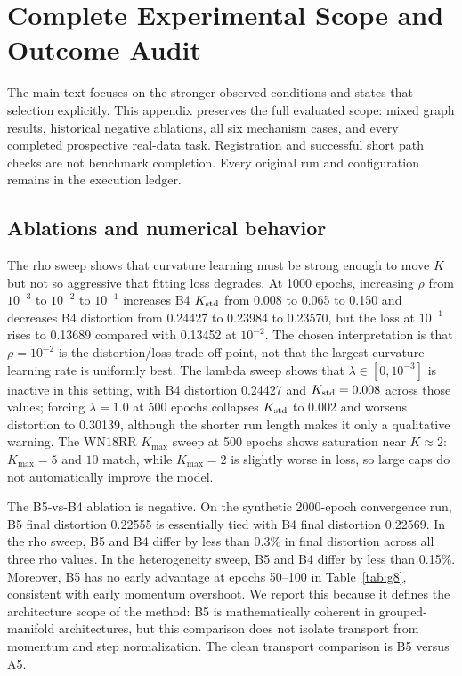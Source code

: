 \section{Complete Experimental Scope and Outcome Audit}
\label{app:extended-audit}
The main text focuses on the stronger observed conditions and states that selection explicitly. This appendix preserves the full evaluated scope: mixed graph results, historical negative ablations, all six mechanism cases, and every completed prospective real-data task. Registration and successful short path checks are not benchmark completion. Every original run and configuration remains in the execution ledger.

\subsection{Ablations and numerical behavior}

The rho sweep shows that curvature learning must be strong enough to move $K$ but not so aggressive that fitting loss degrades. At 1000 epochs, increasing $\rho$ from $10^{-3}$ to $10^{-2}$ to $10^{-1}$ increases B4 $K_{\mathrm{std}}$ from 0.008 to 0.065 to 0.150 and decreases B4 distortion from 0.24427 to 0.23984 to 0.23570, but the loss at $10^{-1}$ rises to 0.13689 compared with 0.13452 at $10^{-2}$. The chosen interpretation is that $\rho=10^{-2}$ is the distortion/loss trade-off point, not that the largest curvature learning rate is uniformly best. The lambda sweep shows that $\lambda\in[0,10^{-3}]$ is inactive in this setting, with B4 distortion 0.24427 and $K_{\mathrm{std}}=0.008$ across those values; forcing $\lambda=1.0$ at 500 epochs collapses $K_{\mathrm{std}}$ to 0.002 and worsens distortion to 0.30139, although the shorter run length makes it only a qualitative warning. The WN18RR $K_{\max}$ sweep at 500 epochs shows saturation near $K\approx2$: $K_{\max}=5$ and $10$ match, while $K_{\max}=2$ is slightly worse in loss, so large caps do not automatically improve the model.

The B5-vs-B4 ablation is negative. On the synthetic 2000-epoch convergence run, B5 final distortion 0.22555 is essentially tied with B4 final distortion 0.22569. In the rho sweep, B5 and B4 differ by less than 0.3\% in final distortion across all three rho values. In the heterogeneity sweep, B5 and B4 differ by less than 0.15\%. Moreover, B5 has no early advantage at epochs 50--100 in Table~\ref{tab:g8}, consistent with early momentum overshoot. We report this because it defines the architecture scope of the method: B5 is mathematically coherent in grouped-manifold architectures, but this comparison does not isolate transport from momentum and step normalization. The clean transport comparison is B5 versus A5.

